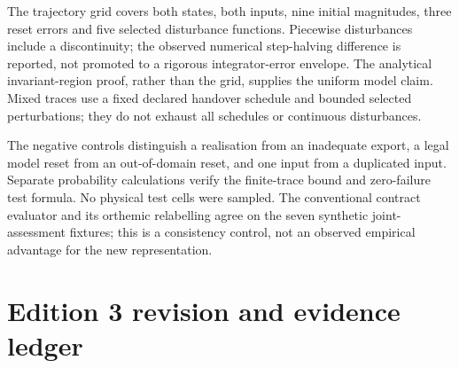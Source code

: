 \documentclass[11pt,a4paper]{article}
\theoremstyle{definition}
\theoremstyle{remark}
\begin{document}
The trajectory grid covers both states, both inputs, nine initial magnitudes, three reset errors and five selected disturbance functions. Piecewise disturbances include a discontinuity; the observed numerical step-halving difference is reported, not promoted to a rigorous integrator-error envelope. The analytical invariant-region proof, rather than the grid, supplies the uniform model claim. Mixed traces use a fixed declared handover schedule and bounded selected perturbations; they do not exhaust all schedules or continuous disturbances.

The negative controls distinguish a realisation from an inadequate export, a legal model reset from an out-of-domain reset, and one input from a duplicated input. Separate probability calculations verify the finite-trace bound and zero-failure test formula. No physical test cells were sampled. The conventional contract evaluator and its orthemic relabelling agree on the seven synthetic joint-assessment fixtures; this is a consistency control, not an observed empirical advantage for the new representation.


\section{Edition 3 revision and evidence ledger}\label{app:edition}
\end{document}
